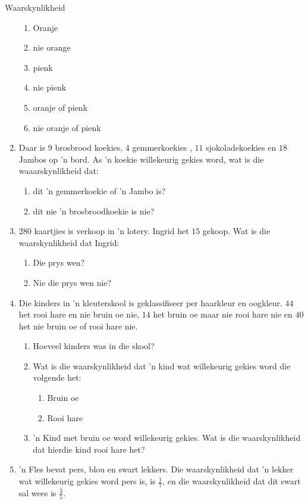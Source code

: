 \begin{eoexercises}{Waarskynlikheid}
\begin{enumerate}[itemsep=5pt, label=\textbf{\arabic*}]
    \begin{enumerate}
    \item Oranje
    \item nie orange
    \item pienk
    \item nie pienk
    \item oranje of pienk
    \item nie oranje of pienk
    \end{enumerate}
  \item Daar is $9$ brosbrood koekies, $4$ gemmerkoekies ,
    $11$ sjokoladekoekies en $18$ Jambos op 'n bord. As 'n koekie willekeurig gekies word, wat is die waaarskynlikheid dat:
    \begin{enumerate}
    \item dit 'n gemmerkoekie of 'n Jambo is?
    \item dit nie 'n brosbroodkoekie is nie?
    \end{enumerate}
  \item $280$ kaartjies is verkoop in 'n lotery. Ingrid het $15$ gekoop. Wat is die waarskynlikheid dat Ingrid:
    \begin{enumerate}
    \item Die prys wen?
    \item Nie die prys wen nie?
    \end{enumerate}
  \item Die kinders in 'n kleuterskool is geklassifiseer per haarkleur en oogkleur. $44$ het rooi hare en nie bruin oe nie, $14$ het bruin oe maar nie rooi hare nie en $40$ het nie bruin oe of rooi hare nie.
    \begin{enumerate}
    \item Hoeveel kinders was in die skool?
    \item Wat is die waarskynlikheid dat 'n kind wat willekeurig gekies word die volgende het:
      \begin{enumerate}
      \item Bruin oe
      \item Rooi hare
      \end{enumerate} 
    \item 'n Kind met bruin oe word willekeurig gekies. Wat is die waarskynlikheid dat hierdie kind rooi hare het?
    \end{enumerate}
  \item 'n Fles bevat pers, blou en swart lekkers. Die waarskynlikheid dat 'n lekker wat willekeurig gekies word pers is, is $\frac{1}{7}$, en die waarskynlikheid dat dit swart sal wees is $\frac{3}{5}$.

\end{enumerate}
\end{eoexercises}
